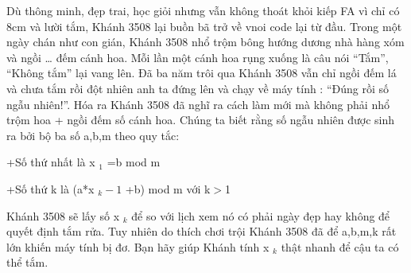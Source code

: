 Dù thông minh, đẹp trai, học giỏi nhưng vẫn không thoát khỏi kiếp FA vì chỉ có 8cm và lười tắm, Khánh 3508 lại buồn bã trở về vnoi code lại từ đầu. Trong một ngày chán như con gián, Khánh 3508 nhổ trộm bông hướng dương nhà hàng xóm và ngồi … đếm cánh hoa. Mỗi lần một cánh hoa rụng xuống là câu nói “Tắm”, “Không tắm” lại vang lên. Đã ba năm trôi qua Khánh 3508 vẫn chỉ ngồi đếm lá và chưa tắm rồi đột nhiên anh ta đứng lên và chạy về máy tính : “Đúng rồi số ngẫu nhiên!”. Hóa ra Khánh 3508 đã nghĩ ra cách làm mới mà không phải nhổ trộm hoa + ngồi đếm số cánh hoa. Chúng ta biết rằng số ngẫu nhiên được sinh ra bởi bộ ba số a,b,m theo quy tắc:  

   +Số thứ nhất là x   $_    1   $   =b mod m  

   +Số thứ k là (a*x   $_    k-1   $   +b) mod m với k$>$1  

   Khánh 3508 sẽ lấy số x   $_    k   $   để so với lịch xem nó có phải ngày đẹp hay không để quyết định tắm rửa. Tuy nhiên do thích chơi trội Khánh 3508 đã để a,b,m,k rất lớn khiến máy tính bị đơ. Bạn hãy giúp Khánh tính x   $_    k   $   thật nhanh để cậu ta có thể tắm.